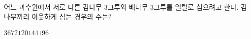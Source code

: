 어느 과수원에서 서로 다른 감나무 3그루와 배나무 3그루를 일렬로 심으려고 한다. 감나무끼리 이웃하게 심는 경우의 수는?
\begin{choices32}{$36$}{$72$}{$120$}{$144$}{$196$}\end{choices32}

